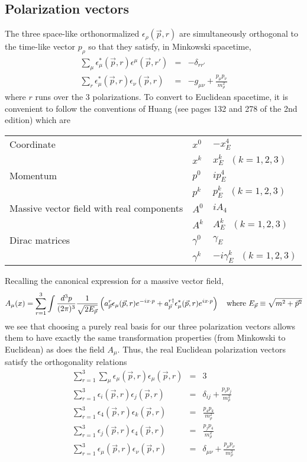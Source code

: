 \documentclass[12pt]{article}
\begin{document}
\subsection{Polarization vectors}

The three space-like orthonormalized 
$\epsilon_\rho(\vec p,r)$ are simultaneously orthogonal to the time-like
vector $p_\rho$ so that they satisfy, in Minkowski spacetime,
\begin{eqnarray*}
\sum_\mu \epsilon^\ast_\mu(\vec p,r) 
  \epsilon^\mu(\vec p,r')&=& -\delta_{rr'} \\
\sum_r\epsilon^\ast_\mu(\vec p,r)
  \epsilon_\nu(\vec p,r)&=&-g_{\mu\nu}+\frac{p_\mu p_\nu}{m_\rho^2}
\end{eqnarray*}
where $r$ runs over the 3 polarizations.
To convert to Euclidean spacetime, it is convenient to follow the
conventions of Huang (see pages 132 and 278 of the 2nd edition) which are

\begin{tabular}{lll}
\hline
Coordinate & $x^0$ & $-x_E^4$ \\
           & $x^k$ & $x_E^k~~~(k=1,2,3)$ \\
\hline
Momentum & $p^0$ & $ip_E^4$ \\
         & $p^k$ & $p_E^k~~~(k=1,2,3)$ \\
\hline
Massive vector field with real components & $A^0$ & $iA_4$ \\
                                          & $A^k$ & $A_E^k~~~(k=1,2,3)$ \\
\hline
Dirac matrices & $\gamma^0$ & $\gamma_E$ \\
               & $\gamma^k$ & $-i\gamma_E^k~~~(k=1,2,3)$ \\
\hline
\end{tabular}

\noindent
Recalling the canonical expression for a massive vector field,
\[
A_\mu(x) = \sum_{r=1}^3\int\frac{d^3p}{(2\pi)^3}\frac{1}{\sqrt{2E_{\vec p}}}
\left(a_{\vec p}^r\epsilon_\mu(\vec p,r)e^{-ix\cdot p}+a_{\vec p}^{r\dagger}
\epsilon_\mu^*(\vec p,r)e^{ix\cdot p}\right)
{\rm ~~~where~}E_{\vec p} \equiv \sqrt{m^2+\vec p^2}
\] 
we see that choosing a purely real basis for our three polarization vectors
allows them to have exactly the same transformation properties (from
Minkowski to Euclidean) as does the field $A_\mu$.
Thus, the real Euclidean polarization vectors satisfy
the orthogonality relations
\begin{eqnarray*}
\sum_{r=1}^3\sum_\mu \epsilon_\mu(\vec{p},r)
  \epsilon_\mu(\vec{p},r)&=& 3 \\
\sum_{r=1}^3\epsilon_i(\vec{p},r)
  \epsilon_j(\vec{p},r)&=&\delta_{ij}+\frac{p_i p_j}{m_\rho^2}\\
\sum_{r=1}^3\epsilon_4(\vec{p},r)
  \epsilon_k(\vec{p},r)&=&\frac{p_4 p_k}{m_\rho^2}\\
\sum_{r=1}^3\epsilon_j(\vec{p},r)
  \epsilon_4(\vec{p},r)&=&\frac{p_j p_4}{m_\rho^2}\\
\sum_{r=1}^3\epsilon_\mu(\vec p,r)
  \epsilon_\nu(\vec p,r)&=&\delta_{\mu\nu}+\frac{p_\mu p_\nu}{m_\rho^2}\\
\end{eqnarray*}
\end{document}
